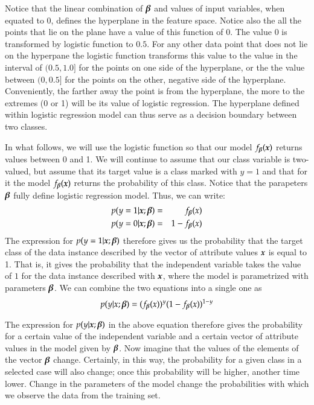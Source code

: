 \begin{refsection}
Notice that the linear combination of $\boldsymbol{\beta}$ and values of input variables, when equated to $0$, defines the hyperplane in the feature space. Notice also the all the points that lie on the plane have a value of this function of $0$. The value $0$ is transformed by logistic function to $0.5$. For any other data point that does not lie on the hyperpane the logistic function transforms this value to the value in the interval of $(0.5, 1.0]$ for the points on one side of the hyperplane, or the the value between $(0, 0.5]$ for the points on the other, negative side of the hyperplane. Conveniently, the farther away the point is from the hyperplane, the more to the extremes (0 or 1) will be its value of logistic regression. The hyperplane defined within logistic regression model can thus serve as a decision boundary between two classes.

In what follows, we will use the logistic function so that our model $f_{\boldsymbol{\beta}}(\boldsymbol{x})$ returns values between 0 and 1. We will continue to assume that our class variable is two-valued, but assume that its target value is a class marked with $y=1$ and that for it the model $f_{\boldsymbol{\beta}} (\boldsymbol{x})$ returns the probability of this class. Notice that the parapeters $\boldsymbol{\beta}$ fully define logistic regression model. Thus, we can write:
\begin{eqnarray}
  p(y=1|\boldsymbol{x};\boldsymbol{\beta}) & = & f_{\boldsymbol{\beta}}(x) \\
  p(y=0|\boldsymbol{x};\boldsymbol{\beta}) & = & 1-f_{\boldsymbol{\beta}}(x)
\end{eqnarray}
The expression for $p(y=1|\boldsymbol{x};\boldsymbol{\beta}) $ therefore gives us the probability that the target class of the data instance described by the vector of attribute values $\boldsymbol{x}$ is equal to 1. That is, it gives the probability that the independent variable takes the value of $1$ for the data instance described with $\boldsymbol{x}$, where the model is parametrized with parameters $\boldsymbol{\beta}$. We can combine the two equations into a single one as
\begin{equation}
  p(y|x;\boldsymbol{\beta}) = (f_{\boldsymbol{\beta}}(x))^y(1-f_{\boldsymbol{\beta}}(x))^{1-y}
\label{eq:log-prob}
\end{equation}

The expression for $p(y|\boldsymbol{x};\boldsymbol{\beta}) $ in the above equation therefore gives the probability for a certain value of the independent variable and a certain vector of attribute values in the model given by $\boldsymbol{\beta}$. Now imagine that the values of the elements of the vector $\boldsymbol{\beta}$ change. Certainly, in this way, the probability for a given class in a selected case will also change; once this probability will be higher, another time lower. Change in the parameters of the model change the probabilities with which we observe the data from the training set.


\end{refsection}

